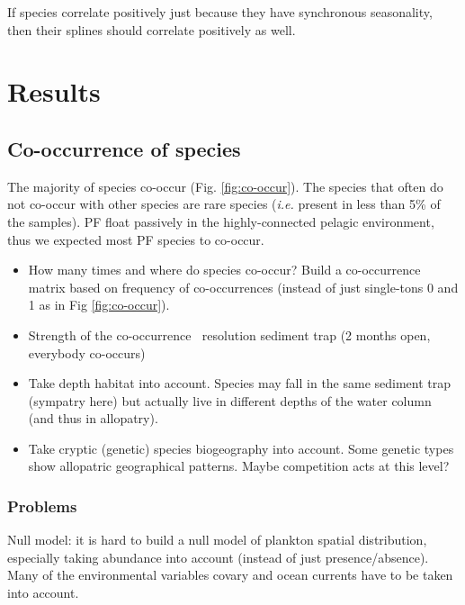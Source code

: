 \documentclass[a4paper]{article}
\begin{document}
If species correlate positively just because they have synchronous seasonality, then their splines should correlate positively as well. 



\section{Results}

\subsection{Co-occurrence of species}

The majority of species co-occur (Fig. \ref{fig:co-occur}). The species that often do not co-occur with other species are rare species (\textit{i.e.} present in less than 5\% of the samples). PF float passively in the highly-connected pelagic environment, thus we expected most PF species to co-occur.

\begin{itemize}
\item How many times and where do species co-occur? Build a co-occurrence matrix based on frequency of co-occurrences (instead of just single-tons 0 and 1 as in Fig \ref{fig:co-occur}).
\item Strength of the co-occurrence $~$ resolution sediment trap (2 months open, everybody co-occurs)
\item Take depth habitat into account. Species may fall in the same sediment trap (sympatry here) but actually live in different depths of the water column (and thus in allopatry).
\item Take cryptic (genetic) species biogeography into account. Some genetic types show allopatric geographical patterns. Maybe competition acts at this level?
\end{itemize}

\subsubsection{Problems}
Null model: it is hard to build a null model of plankton spatial distribution, especially taking abundance into account (instead of just presence/absence). Many of the environmental variables covary and ocean currents have to be taken into account.
\end{document}
